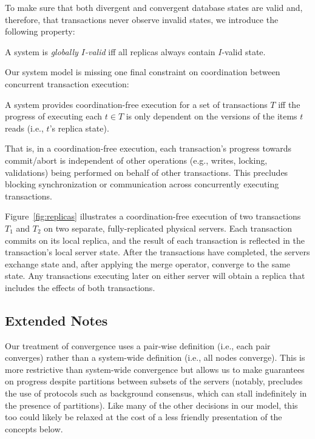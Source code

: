  To make sure that both divergent and
convergent database states are valid and, therefore, that transactions
never observe invalid states, we introduce the following property:

\begin{definition}
A system is \textit{globally $I$-valid} iff all replicas always contain
$I$-valid state.
\end{definition}

 Our system model is missing one final
constraint on coordination between concurrent transaction
execution:

\begin{definition}
  A system provides coordination-free execution for a set of
  transactions $T$ iff the progress of executing each $t\in T$ is only
  dependent on the versions of the items $t$ reads (i.e., $t$'s replica
  state).
\end{definition}

\noindent That is, in a coordination-free execution, each
transaction's progress towards commit/abort is independent of other
operations (e.g., writes, locking, validations) being performed on
behalf of other transactions. This precludes blocking
synchronization or communication across concurrently executing transactions.

 Figure~\ref{fig:replicas} illustrates a
coordination-free execution of two transactions $T_1$ and $T_2$ on two
separate, fully-replicated physical servers. Each transaction commits
on its local replica, and the result of each transaction is reflected
in the transaction's local server state. After the transactions have
completed, the servers exchange state and, after applying the merge
operator, converge to the same state. Any transactions executing later on
either server will obtain a replica that includes the effects of both transactions.

\ifextended
\subsection{Extended Notes}

Our treatment of convergence uses a pair-wise definition (i.e., each
pair converges) rather than a system-wide definition (i.e., all nodes
converge). This is more restrictive than system-wide convergence but
allows us to make guarantees on progress despite partitions
between subsets of the servers (notably, precludes the use of protocols such
as background consensus, which can stall indefinitely in the presence
of partitions). Like many of the other decisions in our model, this
too could likely be relaxed at the cost of a less friendly
presentation of the concepts below.


